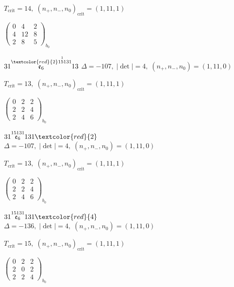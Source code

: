 \documentclass[10pt]{article}
\begin{document}
\hspace{1em}$T_{\text{crit}}=14,\; (n_+,n_-,n_0)_{\text{crit}}=(1,11,1)$

\hspace{2em}$\left(\begin{smallmatrix}0 & 4 & 2 \\ 4 & 12 & 8 \\ 2 & 8 & 5\end{smallmatrix}\right)_{\!b_0}$

\smallskip

$31\overset{\textcolor{red}{2}1\overset{1}{5}131}{\mathfrak{e}_6}13$ \quad $\Delta=-107,\; |\det|=4,\; (n_+,n_-,n_0)=(1,11,0)$

\hspace{1em}$T_{\text{crit}}=13,\; (n_+,n_-,n_0)_{\text{crit}}=(1,11,1)$

\hspace{2em}$\left(\begin{smallmatrix}0 & 2 & 2 \\ 2 & 2 & 4 \\ 2 & 4 & 6\end{smallmatrix}\right)_{\!b_0}$

\smallskip

$31\overset{15131}{\mathfrak{e}_6}131\textcolor{red}{2}$ \quad $\Delta=-107,\; |\det|=4,\; (n_+,n_-,n_0)=(1,11,0)$

\hspace{1em}$T_{\text{crit}}=13,\; (n_+,n_-,n_0)_{\text{crit}}=(1,11,1)$

\hspace{2em}$\left(\begin{smallmatrix}0 & 2 & 2 \\ 2 & 2 & 4 \\ 2 & 4 & 6\end{smallmatrix}\right)_{\!b_0}$

$31\overset{15131}{\mathfrak{e}_6}131\textcolor{red}{4}$ \quad $\Delta=-136,\; |\det|=4,\; (n_+,n_-,n_0)=(1,11,0)$

\hspace{1em}$T_{\text{crit}}=15,\; (n_+,n_-,n_0)_{\text{crit}}=(1,11,1)$

\hspace{2em}$\left(\begin{smallmatrix}0 & 2 & 2 \\ 2 & 0 & 2 \\ 2 & 2 & 4\end{smallmatrix}\right)_{\!b_0}$
\end{document}
